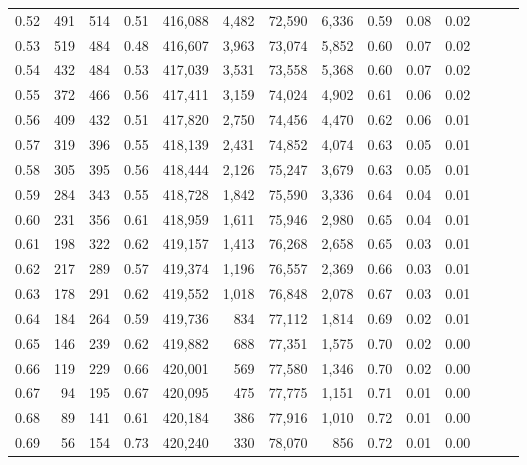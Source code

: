 \begin{tabular}{rrrrrrrrrrrrrr}
0.52 &     491 &    514 &  0.51 &  416,088 &    4,482 &  72,590 &   6,336 &  0.59 &  0.08 &      0.02 \\
0.53 &     519 &    484 &  0.48 &  416,607 &    3,963 &  73,074 &   5,852 &  0.60 &  0.07 &      0.02 \\
0.54 &     432 &    484 &  0.53 &  417,039 &    3,531 &  73,558 &   5,368 &  0.60 &  0.07 &      0.02 \\
0.55 &     372 &    466 &  0.56 &  417,411 &    3,159 &  74,024 &   4,902 &  0.61 &  0.06 &      0.02 \\
0.56 &     409 &    432 &  0.51 &  417,820 &    2,750 &  74,456 &   4,470 &  0.62 &  0.06 &      0.01 \\
0.57 &     319 &    396 &  0.55 &  418,139 &    2,431 &  74,852 &   4,074 &  0.63 &  0.05 &      0.01 \\
0.58 &     305 &    395 &  0.56 &  418,444 &    2,126 &  75,247 &   3,679 &  0.63 &  0.05 &      0.01 \\
0.59 &     284 &    343 &  0.55 &  418,728 &    1,842 &  75,590 &   3,336 &  0.64 &  0.04 &      0.01 \\
0.60 &     231 &    356 &  0.61 &  418,959 &    1,611 &  75,946 &   2,980 &  0.65 &  0.04 &      0.01 \\
0.61 &     198 &    322 &  0.62 &  419,157 &    1,413 &  76,268 &   2,658 &  0.65 &  0.03 &      0.01 \\
0.62 &     217 &    289 &  0.57 &  419,374 &    1,196 &  76,557 &   2,369 &  0.66 &  0.03 &      0.01 \\
0.63 &     178 &    291 &  0.62 &  419,552 &    1,018 &  76,848 &   2,078 &  0.67 &  0.03 &      0.01 \\
0.64 &     184 &    264 &  0.59 &  419,736 &      834 &  77,112 &   1,814 &  0.69 &  0.02 &      0.01 \\
0.65 &     146 &    239 &  0.62 &  419,882 &      688 &  77,351 &   1,575 &  0.70 &  0.02 &      0.00 \\
0.66 &     119 &    229 &  0.66 &  420,001 &      569 &  77,580 &   1,346 &  0.70 &  0.02 &      0.00 \\
0.67 &      94 &    195 &  0.67 &  420,095 &      475 &  77,775 &   1,151 &  0.71 &  0.01 &      0.00 \\
0.68 &      89 &    141 &  0.61 &  420,184 &      386 &  77,916 &   1,010 &  0.72 &  0.01 &      0.00 \\
0.69 &      56 &    154 &  0.73 &  420,240 &      330 &  78,070 &     856 &  0.72 &  0.01 &      0.00 \\

\end{tabular}
